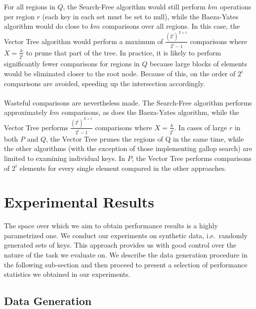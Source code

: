 \documentclass[11pt,letterpaper]{article}
\begin{document}
For all regions in $Q$, the Search-Free algorithm would still
perform $km$ operations per region $r$ (each key in each set must
be set to null), while the Baeza-Yates algorithm would do close to $km$
comparisons over all regions. In this case, the Vector Tree algorithm
would perform a maximum of $\frac{(2^i)^{X+1}}{2^i-1}$ comparisons
where $X=\frac{k}{2^i}$ to prune that part of the tree. In practice, it is
likely to perform significantly fewer comparisons for regions in $Q$ because
large blocks of elements would be eliminated closer to the root node.
Because of this, on the order of $2^i$ comparisons are avoided, speeding
up the intersection accordingly. 

\paragraph{}
Wasteful comparisons are nevertheless made.  The Search-Free algorithm
performs approximately $km$ comparisons, as does the Baeza-Yates
algorithm, while the Vector Tree performs $\frac{(2^i)^{X+1}}{2^i-1}$
comparisons where $X=\frac{k}{2^i}$. In cases of large $r$ in both $P$
and $Q$, the Vector Tree prunes the regions of Q in the same time,
while the other algorithms (with the exception of those implementing gallop
search) are limited to examining individual keys.  In $P$, the Vector Tree
performs comparisons of $2^i$ elements for every single element compared
in the other approaches.

\section{Experimental Results}

The space over which we aim to obtain performance results is a highly
parametrized one. We conduct our experiments on synthetic data, i.e.\
randomly generated sets of keys. This approach provides us with good
control over the nature of the task we evaluate on. We describe the
data generation procedure in the following sub-section and then
proceed to present a selection of performance statistics we obtained
in our experiments.

\subsection{Data Generation}
\end{document}
